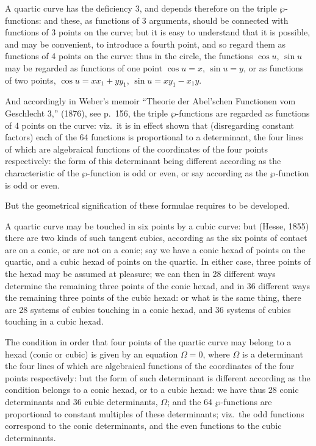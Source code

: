 \documentclass[11pt,a4paper]{article}
\begin{document}
A quartic curve has the deficiency 3, and depends therefore on the triple $\wp$-functions: and these, as functions of 3 arguments, should be connected with functions of 3 points on the curve; but it is easy to understand that it is possible, and may be convenient, to introduce a fourth point, and so regard them as functions of 4 points on the curve: thus in the circle, the functions $\cos u$, $\sin u$ may be regarded as functions of one point $\cos u = x$, $\sin u = y$, or as functions of two points, $\cos u = xx_1 + yy_1$, $\sin u = xy_1 - x_1y$.

And accordingly in Weber's memoir ``Theorie der Abel'schen Functionen vom Geschlecht 3,'' (1876), see p.\ 156, the triple $\wp$-functions are regarded as functions of 4 points on the curve: viz.\ it is in effect shown that (disregarding constant factors) each of the 64 functions is proportional to a determinant, the four lines of which are algebraical functions of the coordinates of the four points respectively: the form of this determinant being different according as the characteristic of the $\wp$-function is odd or even, or say according as the $\wp$-function is odd or even.

But the geometrical signification of these formulae requires to be developed.

\clearpage
A quartic curve may be touched in six points by a cubic curve: but (Hesse, 1855) there are two kinds of such tangent cubics, according as the six points of contact are on a conic, or are not on a conic; say we have a conic hexad of points on the quartic, and a cubic hexad of points on the quartic. In either case, three points of the hexad may be assumed at pleasure; we can then in 28 different ways determine the remaining three points of the conic hexad, and in 36 different ways the remaining three points of the cubic hexad: or what is the same thing, there are 28 systems of cubics touching in a conic hexad, and 36 systems of cubics touching in a cubic hexad.

The condition in order that four points of the quartic curve may belong to a hexad (conic or cubic) is given by an equation $\Omega = 0$, where $\Omega$ is a determinant the four lines of which are algebraical functions of the coordinates of the four points respectively: but the form of such determinant is different according as the condition belongs to a conic hexad, or to a cubic hexad: we have thus 28 conic determinants and 36 cubic determinants, $\Omega$; and the 64 $\wp$-functions are proportional to constant multiples of these determinants; viz.\ the odd functions correspond to the conic determinants, and the even functions to the cubic determinants.
\end{document}

